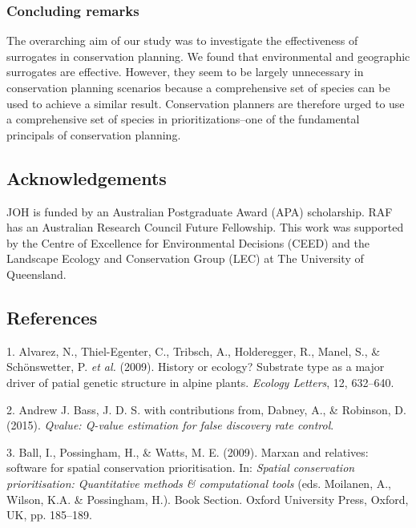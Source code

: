 \documentclass[11pt,]{article}
\begin{document}
\subsubsection{Concluding remarks}\label{concluding-remarks}

The overarching aim of our study was to investigate the effectiveness of
surrogates in conservation planning. We found that environmental and
geographic surrogates are effective. However, they seem to be largely
unnecessary in conservation planning scenarios because a comprehensive
set of species can be used to achieve a similar result. Conservation
planners are therefore urged to use a comprehensive set of species in
prioritizations--one of the fundamental principals of conservation
planning.

\subsection{Acknowledgements}\label{acknowledgements}

JOH is funded by an Australian Postgraduate Award (APA) scholarship. RAF
has an Australian Research Council Future Fellowship. This work was
supported by the Centre of Excellence for Environmental Decisions (CEED)
and the Landscape Ecology and Conservation Group (LEC) at The University
of Queensland.

\subsection*{References}\label{references}

\hypertarget{refs}{}
\hypertarget{ref-r478}{}
1. Alvarez, N., Thiel-Egenter, C., Tribsch, A., Holderegger, R., Manel,
S., \& Schönswetter, P. \emph{et al.} (2009). History or ecology?
Substrate type as a major driver of patial genetic structure in alpine
plants. \emph{Ecology Letters}, 12, 632--640.

\hypertarget{ref-r491}{}
2. Andrew J. Bass, J. D. S. with contributions from, Dabney, A., \&
Robinson, D. (2015). \emph{Qvalue: Q-value estimation for false
discovery rate control}.

\hypertarget{ref-r22}{}
3. Ball, I., Possingham, H., \& Watts, M. E. (2009). Marxan and
relatives: software for spatial conservation prioritisation. In:
\emph{Spatial conservation prioritisation: Quantitative methods \&
computational tools} (eds. Moilanen, A., Wilson, K.A. \& Possingham,
H.). Book Section. Oxford University Press, Oxford, UK, pp. 185--189.
\end{document}
